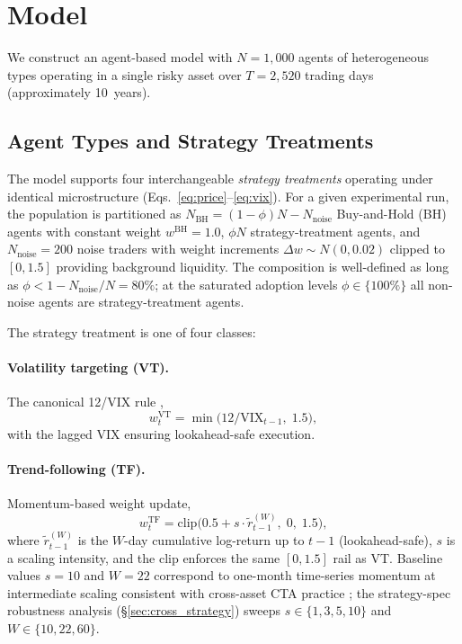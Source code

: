 \documentclass[12pt,a4paper]{article}
\begin{document}
\section{Model}
\label{sec:model}

We construct an agent-based model with $N = 1{,}000$ agents of heterogeneous types operating in a single risky asset over $T = 2{,}520$ trading days (approximately 10~years).

\subsection{Agent Types and Strategy Treatments}
\label{sec:agents}

The model supports four interchangeable \emph{strategy treatments} operating under identical microstructure (Eqs.~\ref{eq:price}--\ref{eq:vix}). For a given experimental run, the population is partitioned as $N_{\text{BH}} = (1 - \phi) N - N_{\text{noise}}$ Buy-and-Hold (BH) agents with constant weight $w^{\text{BH}} = 1.0$, $\phi N$ strategy-treatment agents, and $N_{\text{noise}} = 200$ noise traders with weight increments $\Delta w \sim N(0, 0.02)$ clipped to $[0, 1.5]$ providing background liquidity. The composition is well-defined as long as $\phi < 1 - N_{\text{noise}}/N = 80\%$; at the saturated adoption levels $\phi \in \{100\%\}$ all non-noise agents are strategy-treatment agents.

The strategy treatment is one of four classes:

\paragraph{Volatility targeting (VT).} The canonical 12/VIX rule \citep{perchet2015},
\begin{equation}
  w_t^{\text{VT}} = \min\!\bigl(12 / \text{VIX}_{t-1},\; 1.5\bigr),
  \label{eq:vt_rule}
\end{equation}
with the lagged VIX ensuring lookahead-safe execution.

\paragraph{Trend-following (TF).} Momentum-based weight update,
\begin{equation}
  w_t^{\text{TF}} = \mathrm{clip}\!\bigl(0.5 + s \cdot \tilde{r}^{(W)}_{t-1},\; 0,\; 1.5\bigr),
  \label{eq:tf_rule}
\end{equation}
where $\tilde{r}^{(W)}_{t-1}$ is the $W$-day cumulative log-return up to $t-1$ (lookahead-safe), $s$ is a scaling intensity, and the clip enforces the same $[0, 1.5]$ rail as VT. Baseline values $s = 10$ and $W = 22$ correspond to one-month time-series momentum at intermediate scaling consistent with cross-asset CTA practice \citep{moskowitz2012}; the strategy-spec robustness analysis (\S\ref{sec:cross_strategy}) sweeps $s \in \{1, 3, 5, 10\}$ and $W \in \{10, 22, 60\}$.
\end{document}
